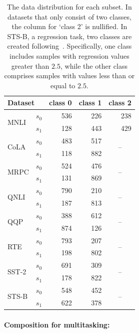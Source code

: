 \begin{table}[!ht]
\caption{The data distribution for each subset. 
In datasets that only consist of two classes, the column for `class 2' is nullified.
In STS-B, a regression task, two classes are created following~\citet{matena2022merging}.
Specifically, one class includes samples with regression values greater than $2.5$, while the other class comprises samples with values less than or equal to $2.5$. 
}
\label{table:split0}
\centering
\begin{tabular}{llrrr}
\toprule
\multicolumn{2}{l}{Dataset} & class 0 & class 1 & class 2 \\ \midrule
\multirow{2}{*}{MNLI} & $s_0$ & 536 & 226 & 238 \\
 & $s_1$ & 128 & 443 & 429 \\
\multirow{2}{*}{CoLA} & $s_0$ & 483 & 517 & \multicolumn{1}{c}{\multirow{2}{*}{--}} \\
 & $s_1$ & 118 & 882 &  \\
\multirow{2}{*}{MRPC} & $s_0$ & 524 & 476 & \multicolumn{1}{c}{\multirow{2}{*}{--}} \\
 & $s_1$ & 131 & 869 &  \\
\multirow{2}{*}{QNLI} & $s_0$ & 790 & 210 & \multicolumn{1}{c}{\multirow{2}{*}{--}} \\
 & $s_1$ & 187 & 813 &  \\
\multirow{2}{*}{QQP} & $s_0$ & 388 & 612 &  \multicolumn{1}{c}{\multirow{2}{*}{--}} \\
 & $s_1$ & 874 & 126 &  \\
\multirow{2}{*}{RTE} & $s_0$ & 793 & 207 &  \multicolumn{1}{c}{\multirow{2}{*}{--}} \\
 & $s_1$ & 198 & 802 &  \\
\multirow{2}{*}{SST-2} & $s_0$ & 691 & 309 & \multicolumn{1}{c}{\multirow{2}{*}{--}} \\
 & $s_1$ & 178 & 822 &  \\
\multirow{2}{*}{STS-B} & $s_0$ & 548 & 452 & \multicolumn{1}{c}{\multirow{2}{*}{--}} \\
 & $s_1$ & 622 & 378 &  \\ \bottomrule
\end{tabular}
\vspace{-5pt}
\end{table}

\paragraph{Composition for multitasking:}


